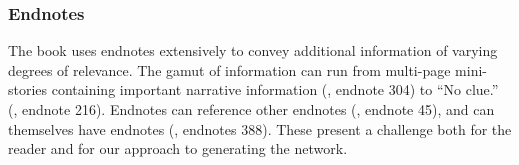 \subsubsection{Endnotes}

The book uses endnotes extensively to convey additional information of varying degrees of relevance. The gamut of information can run from multi-page mini-stories containing important narrative information (\infinitejest, endnote 304) to ``No clue.'' (\infinitejest, endnote 216). Endnotes can reference other endnotes (\infinitejest, endnote 45), and can themselves have endnotes (\infinitejest, endnotes 388). These present a challenge both for the reader and for our approach to generating the network.
